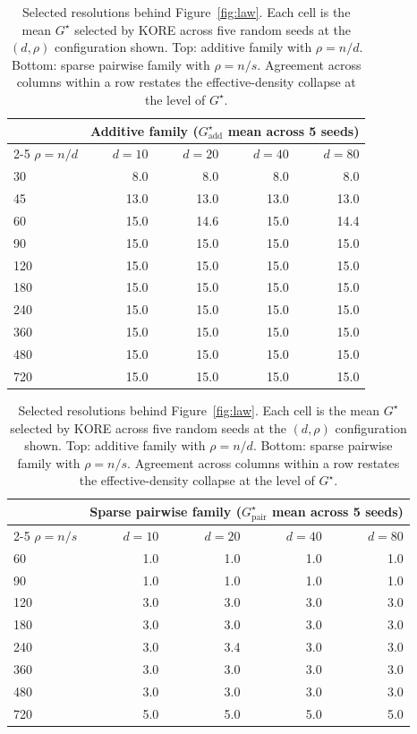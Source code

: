 \documentclass{article}
\newcommand{\KORE}{\textsc{KORE}}
\begin{document}
\begin{table}[h]
\caption{Selected resolutions behind Figure~\ref{fig:law}. Each cell is the mean $G^\star$ selected by \KORE{} across five random seeds at the $(d, \rho)$ configuration shown. Top: additive family with $\rho = n/d$. Bottom: sparse pairwise family with $\rho = n/s$. Agreement across columns within a row restates the effective-density collapse at the level of $G^\star$.}
\label{tab:selected_G}
\centering
\small
\begin{tabular}{@{}lrrrr@{}}
\toprule
 & \multicolumn{4}{c}{Additive family ($G^\star_{\text{add}}$ mean across 5 seeds)} \\
\cmidrule(lr){2-5}
$\rho = n/d$ & $d=10$ & $d=20$ & $d=40$ & $d=80$ \\
\midrule
30  & 8.0  & 8.0  & 8.0  & 8.0  \\
45  & 13.0 & 13.0 & 13.0 & 13.0 \\
60  & 15.0 & 14.6 & 15.0 & 14.4 \\
90  & 15.0 & 15.0 & 15.0 & 15.0 \\
120 & 15.0 & 15.0 & 15.0 & 15.0 \\
180 & 15.0 & 15.0 & 15.0 & 15.0 \\
240 & 15.0 & 15.0 & 15.0 & 15.0 \\
360 & 15.0 & 15.0 & 15.0 & 15.0 \\
480 & 15.0 & 15.0 & 15.0 & 15.0 \\
720 & 15.0 & 15.0 & 15.0 & 15.0 \\
\bottomrule
\end{tabular}
\vspace{0.6em}

\begin{tabular}{@{}lrrrr@{}}
\toprule
 & \multicolumn{4}{c}{Sparse pairwise family ($G^\star_{\text{pair}}$ mean across 5 seeds)} \\
\cmidrule(lr){2-5}
$\rho = n/s$ & $d=10$ & $d=20$ & $d=40$ & $d=80$ \\
\midrule
60  & 1.0 & 1.0 & 1.0 & 1.0 \\
90  & 1.0 & 1.0 & 1.0 & 1.0 \\
120 & 3.0 & 3.0 & 3.0 & 3.0 \\
180 & 3.0 & 3.0 & 3.0 & 3.0 \\
240 & 3.0 & 3.4 & 3.0 & 3.0 \\
360 & 3.0 & 3.0 & 3.0 & 3.0 \\
480 & 3.0 & 3.0 & 3.0 & 3.0 \\
720 & 5.0 & 5.0 & 5.0 & 5.0 \\
\bottomrule
\end{tabular}
\end{table}
\end{document}
